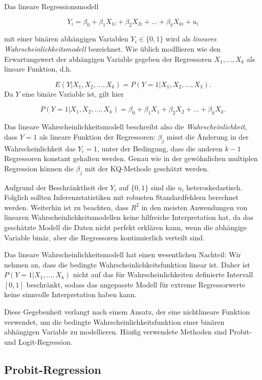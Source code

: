 \documentclass[
  a4paper,
  DIV=11,
  oneside]{scrreprt}
\begin{document}
Das lineare Regressionsmodell

\[Y_i = \beta_0 + \beta_1 X_{1i} + \beta_2 X_{2i} + \dots + \beta_k X_{ki} + u_i\]

mit einer binären abhängigen Variablen \(Y_i\in\{0,1\}\) wird als
\emph{lineares Wahrscheinlichkeitsmodell} bezeichnet. Wie üblich
modllieren wie den Erwartungswert der abhängigen Variable gegeben der
Regressoren \(X_1,\dots,X_k\) als lineare Funktion, d.h.

\[E(Y\vert X_1,X_2,\dots,X_k) = P(Y=1\vert X_1, X_2,\dots, X_3).\] Da
\(Y\) eine binäre Variable ist, gilt hier

\[ P(Y = 1 \vert X_1, X_2, \dots, X_k) = \beta_0 + \beta_1 X_1 + \beta_2 X_2 + \dots + \beta_k X_k.\]

Das lineare Wahrscheinlichkeitsmodell beschreibt also die
\emph{Wahrscheinlichkeit}, dass \(Y=1\) als lineare Funktion der
Regressoren: \(\beta_j\) misst die Änderung in der Wahrscheinlichkeit
das \(Y_i=1\), unter der Bedingung, dass die anderen \(k-1\) Regressoren
konstant gehalten werden. Genau wie in der gewöhnlichen multiplen
Regression können die \(\beta_j\) mit der KQ-Methode geschätzt werden.

Aufgrund der Beschränktheit der \(Y_i\) auf \(\{0,1\}\) sind die \(u_i\)
heteroskedastisch. Folglich sollten Inferenzstatistiken mit robusten
Standardfehlern berechnet werden. Weiterhin ist zu beachten, dass
\(R^2\) in den meisten Anwendungen von linearen
Wahrscheinlichkeitsmodellen keine hilfreiche Interpretation hat, da das
geschätzte Modell die Daten nicht perfekt erklären kann, wenn die
abhängige Variable binär, aber die Regressoren kontinuierlich verteilt
sind.

Das lineare Wahrscheinlichkeitsmodell hat einen wesentlichen Nachteil:
Wir nehmen an, dass die bedingte Wahrscheinlichkeitsfunktion linear ist.
Daher ist \(P(Y=1\vert X_1,\dots,X_k)\) nicht auf das für
Wahrscheinlichkeiten definierte Intervall \([0,1]\) beschränkt, sodass
das angepasste Modell für extreme Regressorwerte keine sinnvolle
Interpretation haben kann.

Diese Gegebenheit verlangt nach einem Ansatz, der eine nichtlineare
Funktion verwendet, um die bedingte Wahrscheinlichkeitsfunktion einer
binären abhängigen Variable zu modellieren. Häufig verwendete Methoden
sind Probit- und Logit-Regression.

\subsection{Probit-Regression}\label{probit-regression}
\end{document}
